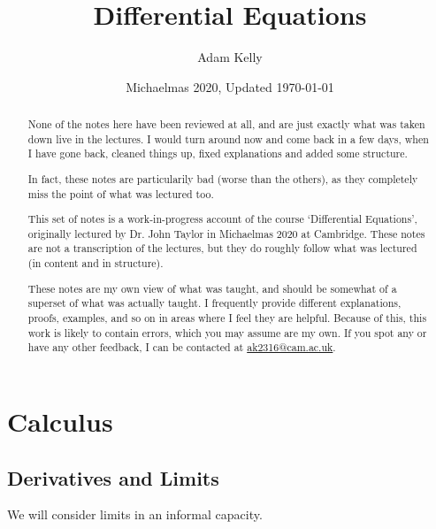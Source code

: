 \documentclass[a4]{scrartcl}
\title{Differential Equations}
\author{Adam Kelly}
\date{Michaelmas 2020, Updated \today}
\begin{document}
\maketitle

\begin{abstract}\vspace{2\baselineskip}
	{\color{red} None of the notes here have been reviewed at all, and are just exactly what was taken down live in the lectures. I would turn around now and come back in a few days, when I have gone back, cleaned things up, fixed explanations and added some structure.
	
	\vspace{2\baselineskip}
	In fact, these notes are particularily bad (worse than the others), as they completely miss the point of what was lectured too.}
	\vspace{5\baselineskip}

	This set of notes is a work-in-progress account of the course `Differential Equations', originally lectured by Dr. John Taylor in Michaelmas 2020 at Cambridge. These notes are not a transcription of the lectures, but they do roughly follow what was lectured (in content and in structure).

	These notes are my own view of what was taught, and should be somewhat of a superset of what was actually taught. I frequently provide different explanations, proofs, examples, and so on in areas where I feel they are helpful. Because of this, this work is likely to contain errors, which you may assume are my own. If you spot any or have any other feedback, I can be contacted at \href{mailto:ak2316@cam.ac.uk}{ak2316@cam.ac.uk}.

\end{abstract}

\tableofcontents

\clearpage

\section{Calculus}

\subsection{Derivatives and Limits}

We will consider limits in an informal capacity.
\end{document}
